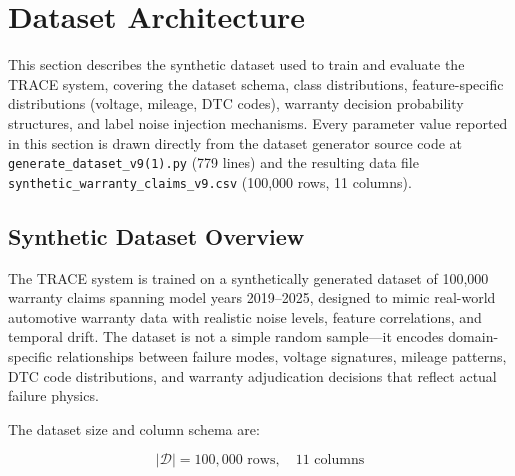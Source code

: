 \documentclass[10pt,a4paper]{article}
\begin{document}
\section{Dataset Architecture}
\label{sec:dataset-architecture}

This section describes the synthetic dataset used to train and evaluate the TRACE system, covering the dataset schema, class distributions, feature-specific distributions (voltage, mileage, DTC codes), warranty decision probability structures, and label noise injection mechanisms. Every parameter value reported in this section is drawn directly from the dataset generator source code at \texttt{generate\_dataset\_v9(1).py} (779 lines) and the resulting data file \texttt{synthetic\_warranty\_claims\_v9.csv} (100{,}000 rows, 11 columns).

\subsection{Synthetic Dataset Overview}
\label{sec:synthetic-dataset-overview}

The TRACE system is trained on a synthetically generated dataset of 100{,}000 warranty claims spanning model years 2019--2025, designed to mimic real-world automotive warranty data with realistic noise levels, feature correlations, and temporal drift. The dataset is not a simple random sample---it encodes domain-specific relationships between failure modes, voltage signatures, mileage patterns, DTC code distributions, and warranty adjudication decisions that reflect actual failure physics.

The dataset size and column schema are:

\begin{equation}
|\mathcal{D}| = 100{,}000 \text{ rows}, \quad 11 \text{ columns}
\label{eq:dataset-size}
\end{equation}
\end{document}
